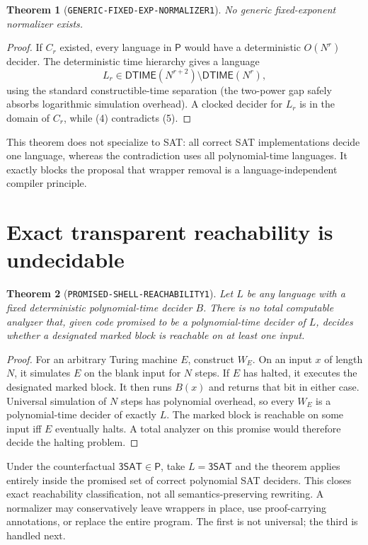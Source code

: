 \documentclass[11pt]{article}
\newtheorem{theorem}{Theorem}
\newcommand{\SAT}{\mathsf{3SAT}}
\begin{document}
\begin{theorem}[\texttt{GENERIC-FIXED-EXP-NORMALIZER1}]
No generic fixed-exponent normalizer exists.
\end{theorem}

\begin{proof}
If $C_r$ existed, every language in $\mathsf P$ would have a deterministic
$O(N^r)$ decider.  The deterministic time hierarchy gives a language
\[
 L_r\in\mathsf{DTIME}(N^{r+2})\setminus\mathsf{DTIME}(N^r), \tag{5}
\]
using the standard constructible-time separation (the two-power gap safely
absorbs logarithmic simulation overhead).  A clocked decider for $L_r$ is in
the domain of $C_r$, while (4) contradicts (5).
\end{proof}

This theorem does not specialize to SAT: all correct SAT implementations
decide one language, whereas the contradiction uses all polynomial-time
languages.  It exactly blocks the proposal that wrapper removal is a
language-independent compiler principle.

\section{Exact transparent reachability is undecidable}

\begin{theorem}[\texttt{PROMISED-SHELL-REACHABILITY1}]
Let $L$ be any language with a fixed deterministic polynomial-time decider
$B$.  There is no total computable analyzer that, given code promised to be a
polynomial-time decider of $L$, decides whether a designated marked block is
reachable on at least one input.
\end{theorem}

\begin{proof}
For an arbitrary Turing machine $E$, construct $W_E$.  On an input $x$ of
length $N$, it simulates $E$ on the blank input for $N$ steps.  If $E$ has
halted, it executes the designated marked block.  It then runs $B(x)$ and
returns that bit in either case.  Universal simulation of $N$ steps has
polynomial overhead, so every $W_E$ is a polynomial-time decider of exactly
$L$.  The marked block is reachable on some input iff $E$ eventually halts.
A total analyzer on this promise would therefore decide the halting problem.
\end{proof}

Under the counterfactual $\SAT\in\mathsf P$, take $L=\SAT$ and the theorem
applies entirely inside the promised set of correct polynomial SAT deciders.
This closes exact reachability classification, not all semantics-preserving
rewriting.  A normalizer may conservatively leave wrappers in place, use
proof-carrying annotations, or replace the entire program.  The first is not
universal; the third is handled next.
\end{document}

